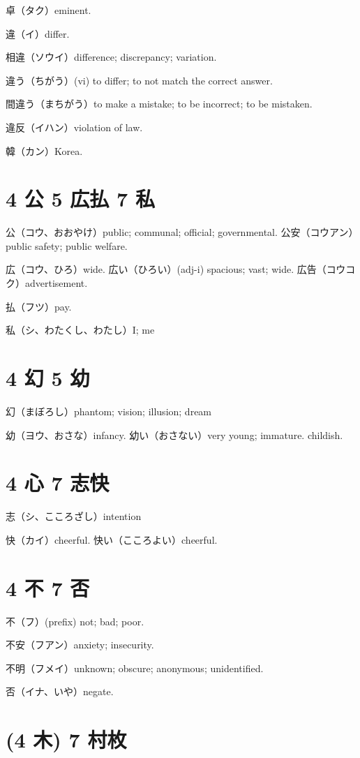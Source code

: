 卓（タク）eminent.

違（イ）differ.

相違（ソウイ）difference; discrepancy; variation.

違う（ちがう）(vi) to differ; to not match the correct answer.

間違う（まちがう）to make a mistake; to be incorrect; to be mistaken.

違反（イハン）violation of law.

韓（カン）Korea.

\section{4 公 5 広払 7 私}

公（コウ、おおやけ）public; communal; official; governmental.
公安（コウアン）public safety; public welfare.

広（コウ、ひろ）wide.
広い（ひろい）(adj-i) spacious; vast; wide.
広告（コウコク）advertisement.

払（フツ）pay.

私（シ、わたくし、わたし）I; me

\section{4 幻 5 幼}

幻（まぼろし）phantom; vision; illusion; dream

幼（ヨウ、おさな）infancy.
幼い（おさない）very young; immature. childish.

\section{4 心 7 志快}

志（シ、こころざし）intention

快（カイ）cheerful.
快い（こころよい）cheerful.

\section{4 不 7 否}

不（フ）(prefix) not; bad; poor.

不安（フアン）anxiety; insecurity.

不明（フメイ）unknown; obscure; anonymous; unidentified.

否（イナ、いや）negate.

\section{(4 木) 7 村枚}

